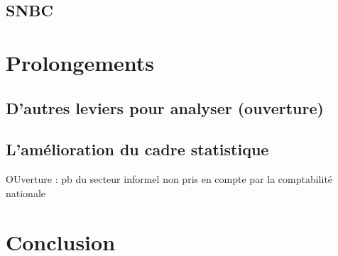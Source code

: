 \documentclass[
]{article}
\begin{document}
\hypertarget{snbc}{%
\subsection{SNBC}\label{snbc}}

\hypertarget{prolongements}{%
\section{Prolongements}\label{prolongements}}

\hypertarget{dautres-leviers-pour-analyser-ouverture}{%
\subsection{D'autres leviers pour analyser
(ouverture)}\label{dautres-leviers-pour-analyser-ouverture}}

\hypertarget{lamuxe9lioration-du-cadre-statistique}{%
\subsection{L'amélioration du cadre
statistique}\label{lamuxe9lioration-du-cadre-statistique}}

OUverture : pb du secteur informel non pris en compte par la
comptabilité nationale

\hypertarget{conclusion}{%
\section{Conclusion}\label{conclusion}}

\printbibliography[title=Bibliographie]
\end{document}
